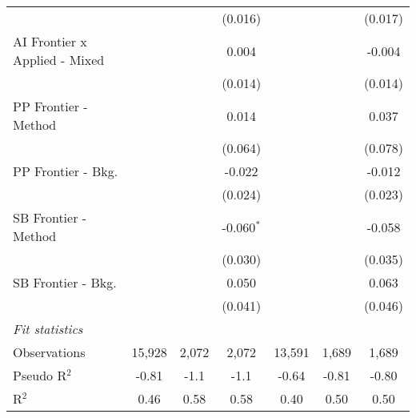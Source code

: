 \begin{tabular}{lcccccc}
                                 &         &         & (0.016)      &              &         & (0.017)\\   
   AI Frontier x Applied - Mixed &         &         & 0.004        &              &         & -0.004\\   
                                 &         &         & (0.014)      &              &         & (0.014)\\   
   PP Frontier - Method          &         &         & 0.014        &              &         & 0.037\\   
                                 &         &         & (0.064)      &              &         & (0.078)\\   
   PP Frontier - Bkg.            &         &         & -0.022       &              &         & -0.012\\   
                                 &         &         & (0.024)      &              &         & (0.023)\\   
   SB Frontier - Method          &         &         & -0.060$^{*}$ &              &         & -0.058\\   
                                 &         &         & (0.030)      &              &         & (0.035)\\   
   SB Frontier - Bkg.            &         &         & 0.050        &              &         & 0.063\\   
                                 &         &         & (0.041)      &              &         & (0.046)\\   
   \midrule
   \emph{Fit statistics}\\
   Observations                  & 15,928  & 2,072   & 2,072        & 13,591       & 1,689   & 1,689\\  
   Pseudo R$^2$                  & -0.81   & -1.1    & -1.1         & -0.64        & -0.81   & -0.80\\  
   R$^2$                         & 0.46    & 0.58    & 0.58         & 0.40         & 0.50    & 0.50\\  
   

\end{tabular}
